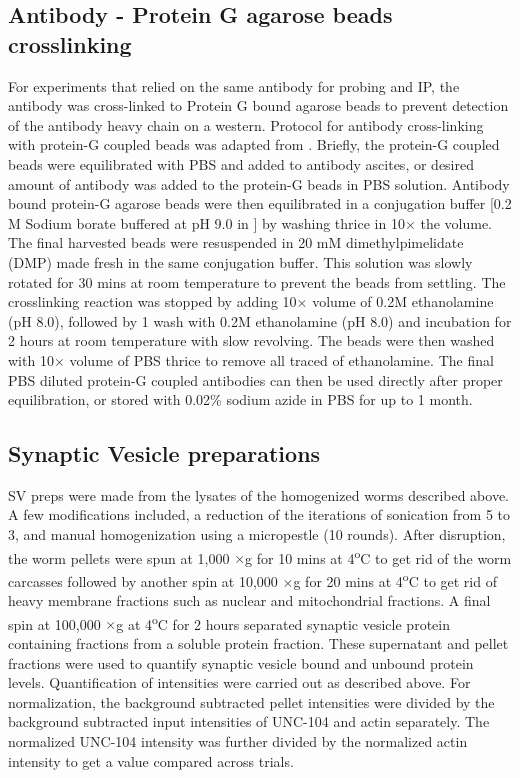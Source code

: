 \subsection{Antibody - Protein G agarose beads crosslinking}

For experiments that relied on the same antibody for probing and IP, the antibody was cross-linked to Protein G bound agarose beads to prevent detection of the antibody heavy chain on a western. Protocol for antibody cross-linking with protein-G coupled beads was adapted from \cite{harlow1988}. Briefly, the protein-G coupled beads were equilibrated with PBS and added to antibody ascites, or desired amount of antibody was added to the protein-G beads in PBS solution. Antibody bound protein-G agarose beads were then equilibrated in a conjugation buffer [0.2 M Sodium borate buffered at pH 9.0 in ] by washing thrice in 10$\times$ the volume. The final harvested beads were resuspended in 20 mM dimethylpimelidate (DMP) made fresh in the same conjugation buffer. This solution was slowly rotated for 30 mins at room temperature to prevent the beads from settling. The crosslinking reaction was stopped by adding 10$\times$ volume of 0.2M ethanolamine (pH 8.0), followed by 1 wash with 0.2M ethanolamine (pH 8.0) and incubation for 2 hours at room temperature with slow revolving. The beads were then washed with 10$\times$ volume of PBS thrice to remove all traced of ethanolamine. The final PBS diluted protein-G coupled antibodies can then be used directly after proper equilibration, or stored with 0.02\% sodium azide in PBS for up to 1 month. 

\subsection{Synaptic Vesicle preparations}

SV preps were made from the lysates of the homogenized worms described above. A few modifications included, a reduction of the iterations of sonication from 5 to 3, and manual homogenization using a micropestle (10 rounds). After disruption, the worm pellets were spun at 1,000 $\times$g for 10 mins at 4\textsuperscript{o}C to get rid of the worm carcasses followed by another spin at 10,000 $\times$g for 20 mins at 4\textsuperscript{o}C to get rid of heavy membrane fractions such as nuclear and mitochondrial fractions. A final spin at 100,000 $\times$g at 4\textsuperscript{o}C for 2 hours separated synaptic vesicle protein containing fractions from a soluble protein fraction. These supernatant and pellet fractions were used to quantify synaptic vesicle bound and unbound protein levels. Quantification of intensities were carried out as described above. For normalization, the background subtracted pellet intensities were divided by the background subtracted input intensities of UNC-104 and actin separately. The normalized UNC-104 intensity was further divided by the normalized actin intensity to get a value compared across trials.

